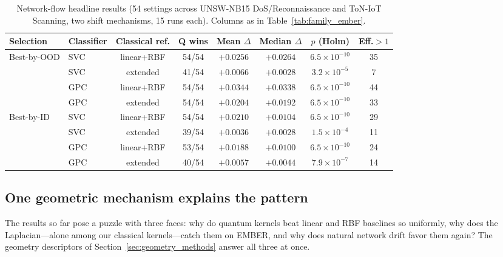 \documentclass[journal]{IEEEtran}
\begin{document}
\begin{table}[!t]
\centering
\caption{Network-flow headline results (54 settings across UNSW-NB15 DoS/Reconnaissance and ToN-IoT Scanning, two shift mechanisms, 15 runs each). Columns as in Table~\ref{tab:family_ember}.}
\label{tab:family_netflow}
\footnotesize
\setlength{\tabcolsep}{3pt}
\begin{tabular}{@{}llcccccc@{}}
\toprule
Selection & Classifier & Classical ref. & Q wins & Mean $\Delta$ & Median $\Delta$ & $p$ (Holm) & Eff.$>1$ \\
\midrule
\multirow{4}{*}{Best-by-OOD} & SVC & linear+RBF & 54/54 & $+0.0256$ & $+0.0264$ & $6.5\times 10^{-10}$ & 35 \\
 & SVC & extended & 41/54 & $+0.0066$ & $+0.0028$ & $3.2\times 10^{-5}$ & 7 \\
 & GPC & linear+RBF & 54/54 & $+0.0344$ & $+0.0338$ & $6.5\times 10^{-10}$ & 44 \\
 & GPC & extended & 54/54 & $+0.0204$ & $+0.0192$ & $6.5\times 10^{-10}$ & 33 \\
\midrule
\multirow{4}{*}{Best-by-ID} & SVC & linear+RBF & 54/54 & $+0.0210$ & $+0.0104$ & $6.5\times 10^{-10}$ & 29 \\
 & SVC & extended & 39/54 & $+0.0036$ & $+0.0028$ & $1.5\times 10^{-4}$ & 11 \\
 & GPC & linear+RBF & 53/54 & $+0.0188$ & $+0.0100$ & $6.5\times 10^{-10}$ & 24 \\
 & GPC & extended & 40/54 & $+0.0057$ & $+0.0044$ & $7.9\times 10^{-7}$ & 14 \\
\bottomrule
\end{tabular}
\end{table}

\subsection{One geometric mechanism explains the pattern}
\label{sec:res_mechanism}

The results so far pose a puzzle with three faces: why do quantum kernels beat linear and RBF baselines so uniformly, why does the Laplacian---alone among our classical kernels---catch them on EMBER, and why does natural network drift favor them again? The geometry descriptors of Section~\ref{sec:geometry_methods} answer all three at once.
\end{document}
